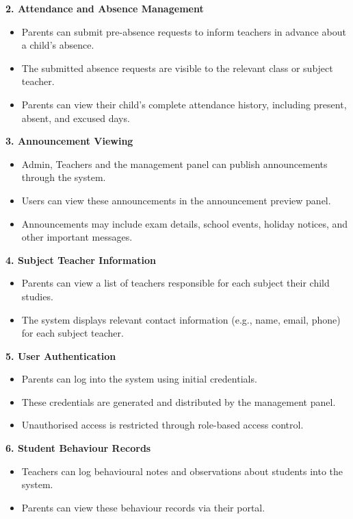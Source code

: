 \documentclass[12pt, a4paper]{report}
\begin{document}
\textbf{2. Attendance and Absence Management}
\begin{itemize}
    \item Parents can submit pre-absence requests to inform teachers in advance about a child's absence.
    \item The submitted absence requests are visible to the relevant class or subject teacher.
    \item Parents can view their child's complete attendance history, including present, absent, and excused days.
\end{itemize}

\textbf{3. Announcement Viewing}
\begin{itemize}
    \item Admin, Teachers and the management panel can publish announcements through the system.
    \item Users can view these announcements in the announcement preview panel.
    \item Announcements may include exam details, school events, holiday notices, and other important messages.
\end{itemize}

\textbf{4. Subject Teacher Information}
\begin{itemize}
    \item Parents can view a list of teachers responsible for each subject their child studies.
    \item The system displays relevant contact information (e.g., name, email, phone) for each subject teacher.
\end{itemize}

\textbf{5. User Authentication}
\begin{itemize}
    \item Parents can log into the system using initial credentials.
    \item These credentials are generated and distributed by the management panel.
    \item Unauthorised access is restricted through role-based access control.
\end{itemize}

\textbf{6. Student Behaviour Records}
\begin{itemize}
    \item Teachers can log behavioural notes and observations about students into the system.
    \item Parents can view these behaviour records via their portal.
\end{itemize}
\end{document}
